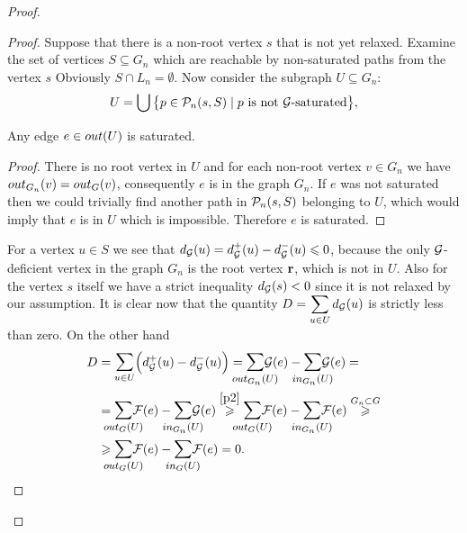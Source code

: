 \documentclass[12pt]{amsart}
\begin{document}
\begin{proof}
\begin{proof}
        Suppose that there is a non-root vertex $s$ that is not yet relaxed.
        Examine the set of vertices $S \subseteq G_n$ which are reachable by non-saturated paths from the vertex $s$
        Obviously $S \cap L_n = \emptyset$.
        Now consider the subgraph $U \subseteq G_n$:
        \[
          U = \bigcup\big\{p \in \gnpaths(s, S) \mid \text{$p$ is not $\cal{G}$-saturated}\big\},
        \]
        \begin{lemma}
          Any edge $e \in \eout(U)$ is saturated.
        \end{lemma}
        \begin{proof}
          There is no root vertex in $U$ and for each non-root vertex $v \in G_n$ we have
          $\eout_{G_n}(v) = \eout_G(v)$, consequently $e$ is in the graph $G_n$.
          If $e$ was not saturated then we could trivially find another path in $\gnpaths(s, S)$ belonging to $U$, which would imply that
            $e$ is in $U$ which is impossible.
          Therefore $e$ is saturated.
        \end{proof}
        For a vertex $u \in S$ we see that $d_{\cal{G}}(u) = d^{+}_{\cal{G}}(u) - d^{-}_{\cal{G}}(u) \leq 0$, because
          the only $\cal{G}$-deficient vertex in the graph $G_n$ is the root vertex $\root$, which is not in $U$.
        Also for the vertex $s$ itself we have a strict inequality $d_{\cal{G}}(s) < 0$ since it is not relaxed by our assumption.
        It is clear now that the quantity $D = \displaystyle\sum_{u \in U} d_{\cal{G}}(u)$ is strictly less than zero.
        On the other hand
        \[
        \begin{split}
          D &= \mathlarger\sum_{u \in U} \Big(d^{+}_{\cal{G}}(u) - d^{-}_{\cal{G}}(u)\Big)
          = \mathlarger{\smashoperator{\sum_{\eout_{G_n}(U)}}} \cal{G}(e) - \mathlarger{\smashoperator{\sum_{\ein_{G_n}(U)}}} \cal{G}(e) = \\
          &= \mathlarger{\smashoperator{\sum_{\eout_{G}(U)}}} \flowpos(e) - \mathlarger{\smashoperator{\sum_{\ein_{G_n}(U)}}} \cal{G}(e)
            \overset{\ref{p2}}{\geq} \mathlarger{\smashoperator{\sum_{\eout_G(U)}}} \flowpos(e) - \mathlarger{\smashoperator{\sum_{\ein_{G_n}(U)}}} \flowpos(e) 
            \overset{G_n \subset G} \geq \\
          &\geq \mathlarger{\smashoperator{\sum_{\eout_G(U)}}} \flowpos(e) - \mathlarger{\smashoperator{\sum_{\ein_{G}(U)}}} \flowpos(e) = 0.

\end{split}\]
\end{proof}
\end{proof}
\end{document}

